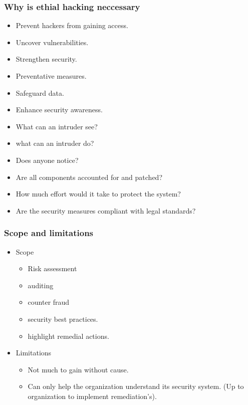 \subsubsection{Why is ethial hacking neccessary}
\begin{itemize}
    \item Prevent hackers from gaining access.
    \item Uncover vulnerabilities.
    \item Strengthen security.
    \item Preventative measures.
    \item Safeguard data.
    \item Enhance security awareness.
    \item What can an intruder see?
    \item what can an intruder do?
    \item Does anyone notice?
    \item Are all components accounted for and patched?
    \item How much effort would it take to protect the system?
    \item Are the security measures compliant with legal standards?
\end{itemize}

\subsubsection{Scope and limitations}
\begin{itemize}
    \item Scope
    \begin{itemize}
        \item Risk assessment
        \item auditing
        \item counter fraud
        \item security best practices.
        \item highlight remedial actions.
    \end{itemize}
    \item Limitations
    \begin{itemize}
        \item Not much to gain without cause.
        \item Can only help the organization understand its security system. (Up to organization to implement remediation's).
    \end{itemize}
\end{itemize}

